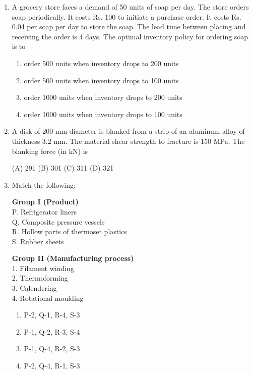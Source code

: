 \documentclass[a4paper,12pt]{article}
\begin{document}
\begin{enumerate}[label=Q.\arabic*, leftmargin=*]
\item A grocery store faces a demand of 50 units of soap per day. The store orders soap periodically. It costs Rs. 100 to initiate a purchase order. It costs Rs. 0.04 per soap per day to store the soap. The lead time between placing and receiving the order is 4 days. The optimal inventory policy for ordering soap is to
\begin{enumerate}[label=(\Alph*)]
\item order 500 units when inventory drops to 200 units 
\item order 500 units when inventory drops to 100 units
\item order 1000 units when inventory drops to 200 units
\item order 1000 units when inventory drops to 100 units
\end{enumerate}

\item A disk of 200 mm diameter is blanked from a strip of an aluminum alloy of thickness 3.2 mm. The material shear strength to fracture is 150 MPa. The blanking force (in kN) is

(A) 291 \hfill (B) 301 \hfill(C) 311 \hfill (D) 321 \\

\noindent 
\item Match the following:

\vspace{0.5em}

\noindent
\begin{minipage}[t]{0.45\textwidth}
\textbf{Group I (Product)}\\[0.5em]
P. Refrigerator liners \\
Q. Composite pressure vessels \\
R. Hollow parts of thermoset plastics \\
S. Rubber sheets
\end{minipage}
\hfill
\begin{minipage}[t]{0.45\textwidth}
\textbf{Group II (Manufacturing process)}\\[0.5em]
1. Filament winding \\
2. Thermoforming \\
3. Calendering \\
4. Rotational moulding
\end{minipage}

\vspace{1em}

\begin{multicols}{2}
\begin{enumerate}[label=(\Alph*)]
    \item P-2, Q-1, R-4, S-3
    \item P-1, Q-2, R-3, S-4
    \item P-1, Q-4, R-2, S-3
    \item P-2, Q-4, R-1, S-3
\end{enumerate}
\end{multicols}


\end{enumerate}
\end{document}
